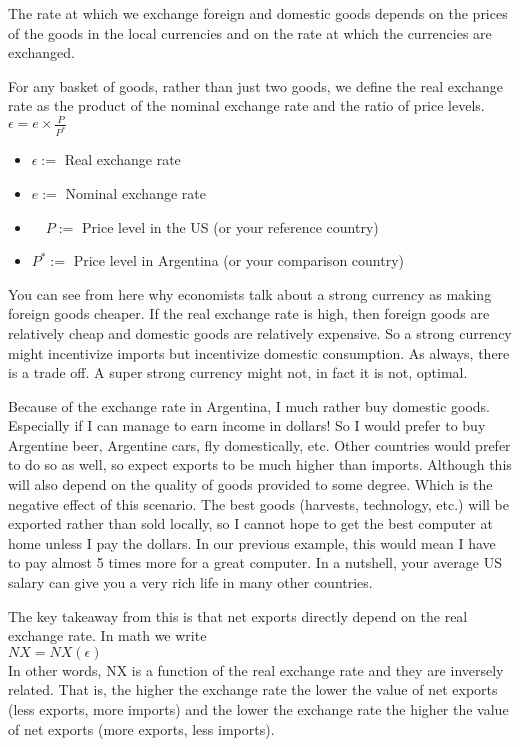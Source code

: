 \documentclass[10pt]{article}
\begin{document}
The rate at which we exchange foreign and domestic goods depends on the prices of the goods in the local currencies and on the rate at which the currencies are exchanged.

For any basket of goods, rather than just two goods, we define the real exchange rate as the product of the nominal exchange rate and the ratio of price levels.\\
$\epsilon=e \times \frac{P}{P^{*}}$

\begin{itemize}
  \item $\epsilon:=$ Real exchange rate
  \item $e:=$ Nominal exchange rate
  \item $\quad P:=$ Price level in the US (or your reference country)
  \item $P^{*}:=$ Price level in Argentina (or your comparison country)
\end{itemize}

You can see from here why economists talk about a strong currency as making foreign goods cheaper. If the real exchange rate is high, then foreign goods are relatively cheap and domestic goods are relatively expensive. So a strong currency might incentivize imports but incentivize domestic consumption. As always, there is a trade off. A super strong currency might not, in fact it is not, optimal.

Because of the exchange rate in Argentina, I much rather buy domestic goods. Especially if I can manage to earn income in dollars! So I would prefer to buy Argentine beer, Argentine cars, fly domestically, etc. Other countries would prefer to do so as well, so expect exports to be much higher than imports. Although this will also depend on the quality of goods provided to some degree. Which is the negative effect of this scenario. The best goods (harvests, technology, etc.) will be exported rather than sold locally, so I cannot hope to get the best computer at home unless I pay the dollars. In our previous example, this would mean I have to pay almost 5 times more for a great computer. In a nutshell, your average US salary can give you a very rich life in many other countries.

The key takeaway from this is that net exports directly depend on the real exchange rate. In math we write\\
$N X=N X(\epsilon)$\\
In other words, NX is a function of the real exchange rate and they are inversely related. That is, the higher the exchange rate the lower the value of net exports (less exports, more imports) and the lower the exchange rate the higher the value of net exports (more exports, less imports).
\end{document}
